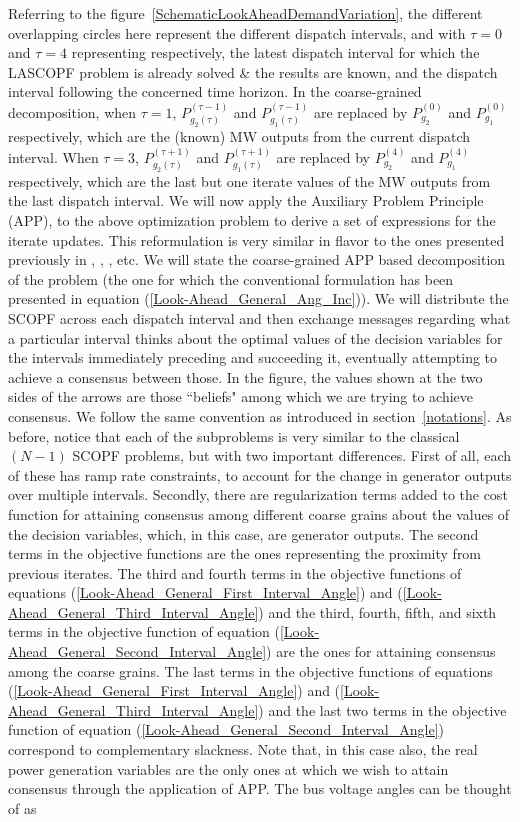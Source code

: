 \documentclass[preprint,12pt,3p]{elsarticle}
\begin{document}
	Referring to the figure~\ref{SchematicLookAheadDemandVariation}, the different overlapping circles here represent the different dispatch intervals, and with $\tau=0$ and $\tau=4$ representing respectively, the latest dispatch interval for which the LASCOPF problem is already solved \& the results are known, and the dispatch interval following the concerned time horizon. In the coarse-grained decomposition, when $\tau = 1$, $P_{g_2(\tau)}^{(\tau-1)}$ and $P_{g_1(\tau)}^{(\tau-1)}$ are replaced by $P_{g_2}^{(0)}$ and $P_{g_1}^{(0)}$ respectively, which are the (known) MW outputs from the current dispatch interval. When $\tau = 3$, $P_{g_2(\tau)}^{(\tau+1)}$ and $P_{g_1(\tau)}^{(\tau+1)}$ are replaced by $P_{g_2}^{(4)}$ and $P_{g_1}^{(4)}$ respectively, which are the last but one iterate values of the MW outputs from the last dispatch interval. We will now apply the Auxiliary Problem Principle (APP)\cite{Cohen:78},  \cite{Cohen:80} to the above optimization problem to derive a set of expressions for the iterate updates. This reformulation is very similar in flavor to the ones presented previously in \cite{KB:97}, \cite{BKCL:99}, \cite{EbrBald:2000}, \cite{BatRen:92} etc. We will state the coarse-grained APP based decomposition of the problem (the one for which the conventional formulation has been presented in equation (\ref{Look-Ahead_General_Ang_Inc})). We will distribute the SCOPF across each dispatch interval and then exchange messages regarding what a particular interval thinks about the optimal values of the decision variables for the intervals immediately preceding and succeeding it, eventually attempting to achieve a consensus between those. In the figure, the values shown at the two sides of the arrows are those ``beliefs" among which we are trying to achieve consensus. We follow the same convention as introduced in section~\ref{notations}. As before, notice that each of the subproblems is very similar to the classical $(N-1)$ SCOPF problems, but with two important differences. First of all, each of these has ramp rate constraints, to account for the change in generator outputs over multiple intervals. Secondly, there are regularization terms added to the cost function for attaining consensus among different coarse grains about the values of the decision variables, which, in this case, are generator outputs. The second terms in the objective functions are the ones representing the proximity from previous iterates. The third and fourth terms in the objective functions of equations (\ref{Look-Ahead_General_First_Interval_Angle}) and (\ref{Look-Ahead_General_Third_Interval_Angle}) and the third, fourth, fifth, and sixth terms in the objective function of equation (\ref{Look-Ahead_General_Second_Interval_Angle}) are the ones for attaining consensus among the coarse grains. The last terms in the objective functions of equations (\ref{Look-Ahead_General_First_Interval_Angle}) and (\ref{Look-Ahead_General_Third_Interval_Angle}) and the last two terms in the objective function of equation (\ref{Look-Ahead_General_Second_Interval_Angle}) correspond to complementary slackness. Note that, in this case also, the real power generation variables are the only ones at which we wish to attain consensus through the application of APP. The bus voltage angles can be thought of as 
\end{document}
